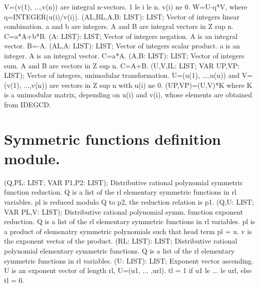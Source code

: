 V=(v(1), ...,v(n)) are integral n-vectors.  1 le i le n.  v(i)
ne 0. W=U-q*V, where q=INTEGER(u(i)/v(i)). \ecom 
{} (AL,BL,A,B: LIST): LIST; \eproc
\bcom Vector of integers linear combination. a and b are integers. A
and B are integral vectors in Z sup n. C=a*A+b*B. \ecom 
{} (A: LIST): LIST; \eproc
\bcom Vector of integers negation. A is an integral vector. B=-A. \ecom 
{} (AL,A: LIST): LIST; \eproc
\bcom Vector of integers scalar product. a is an integer. A is an
integral vector. C=a*A. \ecom 
{} (A,B: LIST): LIST; \eproc
\bcom Vector of integers sum. A and B are vectors in Z sup n. C=A+B. \ecom 
{} (U,V,IL: LIST; VAR UP,VP: LIST); \eproc
\bcom Vector of integers, unimodular transformation. U=(u(1), ...,u(n))
and V=(v(1), ...,v(n)) are vectors in Z sup n with u(i) ne 0.
(UP,VP)=(U,V)*K where K is a unimodular matrix, depending on u(i)
and v(i), whose elements are obtained from IDEGCD. \ecom 
\section{ Symmetric functions definition module. } 
 (Q,PL: LIST; VAR P1,P2: LIST); \eproc
\bcom Distributive rational polynomial symmetric function reduction.
Q is a list of the rl elementary symmetric functions in rl 
variables. pl is reduced modulo Q to p2, the reduction relation 
is p1.  \ecom 
{} (Q,U: LIST; VAR PL,V: LIST); \eproc
\bcom Distributive rational polynomial symm. function exponent reduction.
Q is a list of the rl elementary symmetric functions in rl 
variables. pl is a product of elemenatry symmetric polynomials such 
that head term pl = u. v is the exponent vector of the product.  \ecom 
{} (RL: LIST): LIST; \eproc
\bcom Distributive rational polynomial elementary symmetric functions.
Q is a list of the rl elementary symmetric functions in rl 
variables.  \ecom 
{} (U: LIST): LIST; \eproc
\bcom Exponent vector ascending. U is an exponent vector of length rl,
U=(u1, ... ,url). tl = 1 if u1 le ... le url, else tl = 0.  \ecom 
